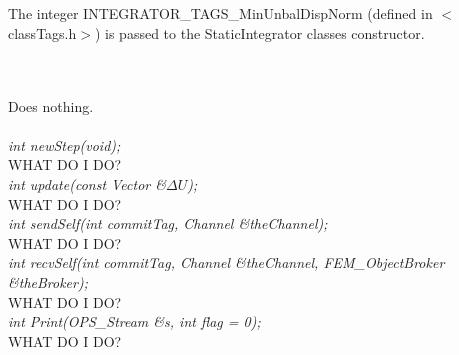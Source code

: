  \\
\\ 
The integer INTEGRATOR\_TAGS\_MinUnbalDispNorm (defined in
$<$classTags.h$>$) is passed to the StaticIntegrator classes
constructor. 


 \\
\\ 
Does nothing. \\

\\

{\em int newStep(void);} \\
WHAT DO I DO?\\

{\em int update(const Vector \&$\Delta U$);} \\
WHAT DO I DO?\\

{\em int sendSelf(int commitTag, Channel \&theChannel); } \\ 
WHAT DO I DO?\\

{\em int recvSelf(int commitTag, Channel \&theChannel, 
FEM\_ObjectBroker \&theBroker); } \\ 
WHAT DO I DO?\\

{\em int Print(OPS_Stream \&s, int flag = 0);}\\
WHAT DO I DO?